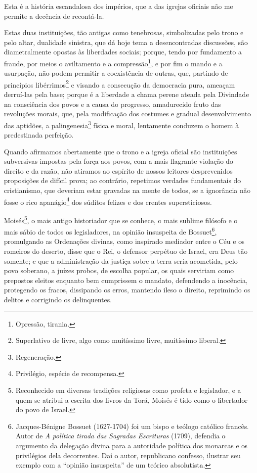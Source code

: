 Esta é a história escandalosa dos impérios, que a das igrejas oficiais
não me permite a decência de recontá-la.

Estas duas instituições, tão antigas como tenebrosas, simbolizadas pelo
trono e pelo altar, dualidade sinistra, que dá hoje tema a
desencontradas discussões, são diametralmente opostas às liberdades
sociais; porque, tendo por fundamento a fraude, por meios o aviltamento
e a compressão\footnote{Opressão, tirania.}, e por fim o mando e a
usurpação, não podem permitir a coexistência de outras, que, partindo de
princípios libérrimos\footnote{Superlativo de livre, algo como
  muitíssimo livre, muitíssimo liberal.} e visando a consecução da
democracia pura, ameaçam derruí-las pela base; porque é a liberdade a
chama perene ateada pela Divindade na consciência dos povos e a causa do
progresso, amadurecido fruto das revoluções morais, que, pela
modificação dos costumes e gradual desenvolvimento das aptidões, a
palingenesia\footnote{Regeneração.} física e moral, lentamente
conduzem o homem à predestinada perfeição.

Quando afirmamos abertamente que o trono e a igreja oficial são
instituições subversivas impostas pela força aos povos, com a mais
flagrante violação do direito e da razão, não atiramos ao espírito de
nossos leitores desprevenidos proposições de difícil prova; ao
contrário, repetimos verdades fundamentais do cristianismo, que deveriam
estar gravadas na mente de todos, se a ignorância não fosse o rico
apanágio\footnote{Privilégio, espécie de recompensa.} dos súditos
felizes e dos crentes supersticiosos.

Moisés\footnote{Reconhecido em diversas tradições religiosas como
  profeta e legislador, e a quem se atribui a escrita dos livros da
  Torá, Moisés é tido como o libertador do povo de Israel.}, o mais
antigo historiador que se conhece, o mais sublime filósofo e o mais
sábio de todos os legisladores, na opinião insuspeita de
Bossuet\footnote{Jacques-Bénigne Bossuet (1627-1704) foi um bispo e
  teólogo católico francês. Autor de \emph{A política tirada das
  Sagradas Escrituras} (1709), defendia o argumento da delegação divina
  para a autoridade política dos monarcas e os privilégios dela
  decorrentes. Daí o autor, republicano confesso, ilustrar seu exemplo
  com a ``opinião insuspeita'' de um teórico absolutista.}, promulgando as
Ordenações divinas, como inspirado mediador entre o Céu e os romeiros do
deserto, disse que o Rei, o defensor perpétuo de Israel, era Deus tão
somente; e que a administração da justiça sobre a terra seria acometida,
pelo povo soberano, a juízes probos, de escolha popular, os quais
serviriam como prepostos eleitos enquanto bem cumprissem o mandato,
defendendo a inocência, protegendo os fracos, dissipando os erros,
mantendo ileso o direito, reprimindo os delitos e corrigindo os
delinquentes.

